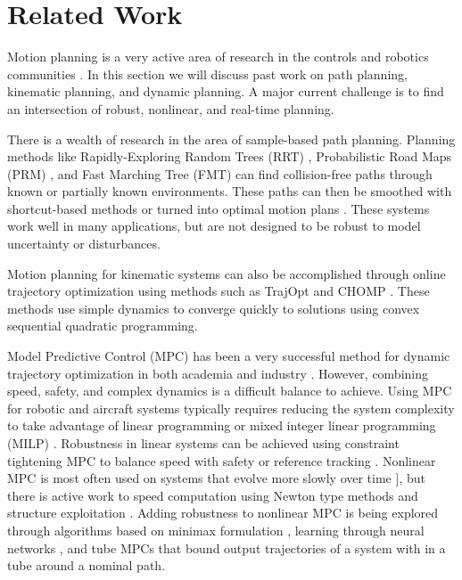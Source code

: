 \section{Related Work \label{sec:relatedwork}}
Motion planning is a very active area of research in the controls and robotics communities \cite{Hoy2015}.  In this section we will discuss past work on path planning, kinematic planning, and dynamic planning.  A major current challenge is to find an intersection of robust, nonlinear, and real-time planning. 

There is a wealth of research in the area of sample-based path planning.  Planning methods like Rapidly-Exploring Random Trees (RRT) \cite{Kuffner2000}, Probabilistic Road Maps (PRM) \cite{Kavraki1996}, and Fast Marching Tree (FMT) \cite{Janson2015} can find collision-free paths through known or partially known environments.  These paths can then be smoothed with shortcut-based methods or turned into optimal motion plans \cite{Richter2016, Karaman2011, Kobilarov2012}.  These systems work well in many applications, but are not designed to be robust to model uncertainty or disturbances.

Motion planning for kinematic systems can also be accomplished through online trajectory optimization using methods such as TrajOpt \cite{Schulman2013} and CHOMP \cite{Ratliff2009}.  These methods use simple dynamics to converge quickly to solutions using convex sequential quadratic programming. 

Model Predictive Control (MPC) has been a very successful method for dynamic trajectory optimization in both academia and industry \cite{Qin2003}.  However, combining speed, safety, and complex dynamics is a difficult balance to achieve. 
Using MPC for robotic and aircraft systems typically requires reducing the system complexity to take advantage of linear programming or mixed integer linear programming (MILP) \cite{Alexis2016, Bellingham2002, Vitus2008, Zeilinger2011, Richter2012}. Robustness in linear systems can be achieved using constraint tightening MPC to balance speed with safety \cite{Kuwata2007, Richards2006} or reference tracking \cite{DiCairano2016}. Nonlinear MPC is most often used on systems that evolve more slowly over time \cite{Diehl2002, Schildbach2016}], but there is active work to speed computation using Newton type methods and structure exploitation \cite{Diehl2009, Grune2011, Quirynen2015, Gupta2015, Neunert2016, Torrisi2016}. Adding robustness to nonlinear MPC is being explored through algorithms based on minimax formulation \cite{Lofberg2003, Kumar2014}, learning through neural networks \cite{Yan2014}, and tube MPCs \cite{Mayne2011, Kumar2014, Gao2014} that bound output trajectories of a system with in a tube around a nominal path.

